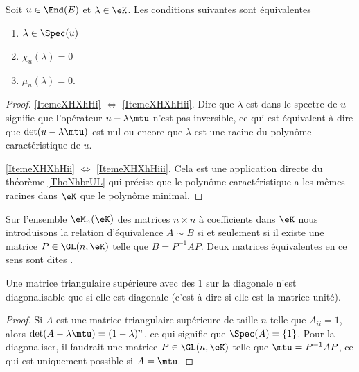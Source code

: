 \begin{theorem}
    Soit \( u\in\End(E)\) et \( \lambda\in\eK\). Les conditions suivantes sont équivalentes
    \begin{enumerate}
        \item\label{ItemeXHXhHi}
            \( \lambda\in\Spec(u)\)
        \item\label{ItemeXHXhHii}
            \( \chi_u(\lambda)=0\)
        \item\label{ItemeXHXhHiii}
            \( \mu_u(\lambda)=0\).
    \end{enumerate}
\end{theorem}

\begin{proof}
    \ref{ItemeXHXhHi} \( \Leftrightarrow\) \ref{ItemeXHXhHii}. Dire que \( \lambda\) est dans le spectre de \( u\) signifie que l'opérateur \( u-\lambda\mtu\) n'est pas inversible, ce qui est équivalent à dire que \( \det(u-\lambda\mtu)\) est nul ou encore que \( \lambda\) est une racine du polynôme caractéristique de \( u\). 

    \ref{ItemeXHXhHii} \( \Leftrightarrow\) \ref{ItemeXHXhHiii}. Cela est une application directe du théorème \ref{ThoNhbrUL} qui précise que le polynôme caractéristique a les mêmes racines dans \(\eK\) que le polynôme minimal.
\end{proof}

Sur l'ensemble \( \eM_n(\eK)\) des matrices \( n\times n\) à coefficients dans \(\eK\) nous introduisons la relation d'équivalence \( A\sim B\) si et seulement si il existe une matrice \( P\in\GL(n,\eK)\) telle que \( B=P^{-1}AP\). Deux matrices équivalentes en ce sens sont dites .

\begin{lemma}
    Une matrice triangulaire supérieure avec des \( 1\) sur la diagonale n'est diagonalisable que si elle est diagonale (c'est à dire si elle est la matrice unité).
\end{lemma}

\begin{proof}
    Si \( A\) est une matrice triangulaire supérieure de taille \( n\) telle que \( A_{ii}=1\), alors \( \det(A-\lambda\mtu)=(1-\lambda)^n\), ce qui signifie que \( \Spec(A)=\{ 1 \}\). Pour la diagonaliser, il faudrait une matrice \( P\in\GL(n,\eK)\) telle que \( \mtu=P^{-1}AP\), ce qui est uniquement possible si \( A=\mtu\).
\end{proof}

